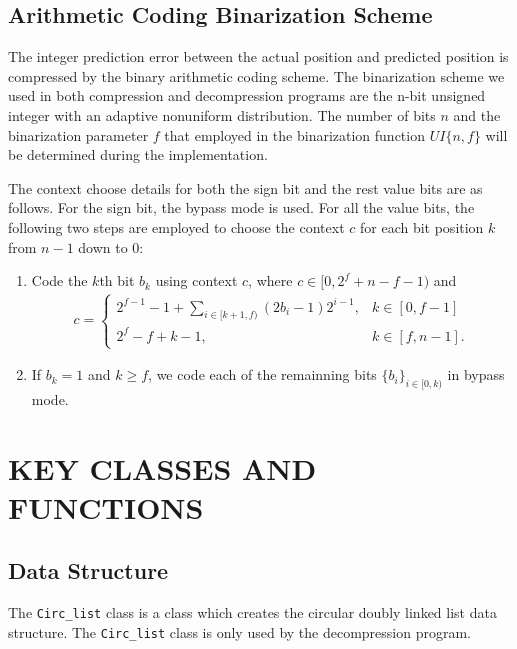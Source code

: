 \documentclass[onecolumn, 12pt]{article}
\begin{document}
\subsection{Arithmetic Coding Binarization Scheme}
The integer prediction error between the actual position and predicted position is compressed by the binary arithmetic coding scheme. The binarization scheme we used in both compression and decompression programs are the n-bit unsigned integer with an adaptive nonuniform distribution. \cite{BinarizationScheme} The number of bits $n$ and the binarization parameter $f$ that employed in the binarization function $UI\{n, f\}$ will be determined during the implementation.


The context choose details for both the sign bit and the rest value bits are as follows. For the sign bit, the bypass mode is used. For all the value bits, the following two steps are employed to choose the context $c$ for each bit position $k$ from $n - 1$ down to $0$:

\begin{enumerate}
\item Code the $k$th bit $b_k$ using context $c$, where $c \in [0, 2^f + n - f - 1)$ and
\begin{align}
c = \begin{cases}
2^{f - 1} - 1 + \sum_{i \in [k + 1, f)} (2b_i - 1)2^{i-1}, & k \in [0, f - 1] \\
2^f - f + k - 1, & k \in [f, n - 1].
\end{cases}
\end{align}

\item If $b_k = 1$ and $k \geq f$, we code each of the remainning bits $\{b_i\}_{i \in [0, k)}$ in bypass mode.
\end{enumerate}




\section{KEY CLASSES AND FUNCTIONS}
\subsection{Data Structure}
The \lstinline!Circ_list! class is a class which creates the circular doubly linked list data structure. The \lstinline!Circ_list! class is only used by the decompression program.\vspace{0.5em}
\end{document}
